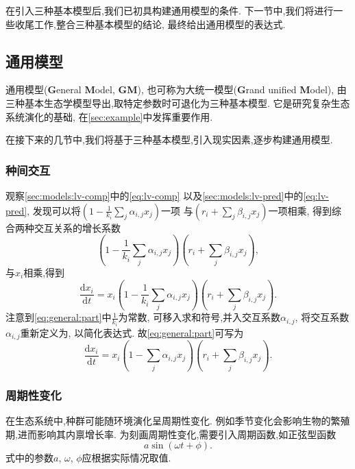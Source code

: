 \documentclass[a4paper, twocolumn]{ctexart}
\begin{document}
在引入三种基本模型后,我们已初具构建通用模型的条件.
下一节中,我们将进行一些收尾工作,整合三种基本模型的结论,
最终给出通用模型的表达式.

\subsection{通用模型} \label{sec:models:general}
通用模型(\textbf{G}eneral \textbf{M}odel, \textbf{GM}),
也可称为大统一模型(\textbf{G}rand unified \textbf{M}odel),
由三种基本生态学模型导出,取特定参数时可退化为三种基本模型.
它是研究复杂生态系统演化的基础,
在\cref{sec:example}中发挥重要作用.

在接下来的几节中,我们将基于三种基本模型,引入现实因素,逐步构建通用模型.

\subsubsection{种间交互}
观察\cref{sec:models:lv-comp}中的\cref{eq:lv-comp}
以及\cref{sec:models:lv-pred}中的\cref{eq:lv-pred},
发现可以将$(1 - \frac{1}{k_i} \sum_{j} \alpha_{i,j} x_j)$一项
与$(r_i + \sum_{j} \beta_{i,j} x_j)$一项相乘,
得到综合两种交互关系的增长系数
\begin{equation*}
    (1 - \frac{1}{k_i} \sum_{j} \alpha_{i,j} x_j)(r_i + \sum_{j} \beta_{i,j} x_j),
\end{equation*}
与$x_i$相乘,得到
\begin{equation} \label{eq:general:part}
    \frac{\mathrm{d} x_i}{\mathrm{d} t} = x_i (1 - \frac{1}{k_i} \sum_{j} \alpha_{i,j} x_j) (r_i + \sum_{j} \beta_{i,j} x_j).
\end{equation}
注意到\cref{eq:general:part}中$\frac{1}{k_i}$为常数,
可移入求和符号,并入交互系数$\alpha_{i,j}$,
将交互系数$\alpha_{i,j}$重新定义为,
以简化表达式.
故\cref{eq:general:part}可写为
\begin{equation}
    \frac{\mathrm{d} x_i}{\mathrm{d} t} = x_i (1 - \sum_{j} \alpha_{i,j} x_j) (r_i + \sum_{j} \beta_{i,j} x_j).
\end{equation}

\subsubsection{周期性变化} \label{sec:models:general:freq}
在生态系统中,种群可能随环境演化呈周期性变化.
例如季节变化会影响生物的繁殖期,进而影响其内禀增长率.
为刻画周期性变化,需要引入周期函数,如正弦型函数
\begin{equation*}
    a \sin(\omega t + \phi).
\end{equation*}
式中的参数$a$, $\omega$, $\phi$应根据实际情况取值.
\end{document}
